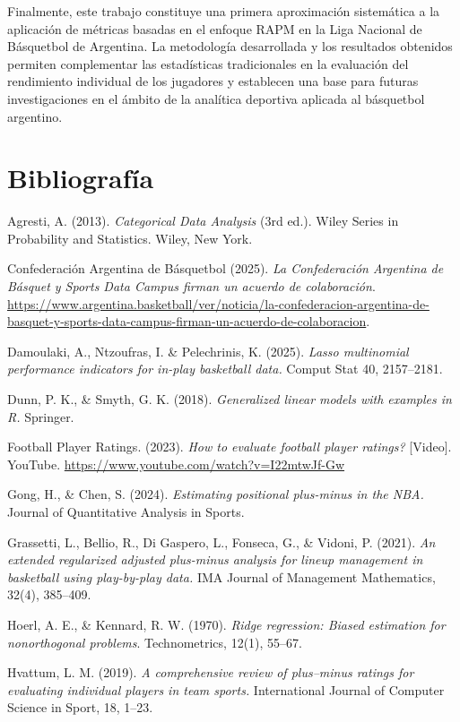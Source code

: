 \documentclass[
  12pt,
]{article}
\begin{document}
Finalmente, este trabajo constituye una primera aproximación sistemática
a la aplicación de métricas basadas en el enfoque RAPM en la Liga
Nacional de Básquetbol de Argentina. La metodología desarrollada y los
resultados obtenidos permiten complementar las estadísticas
tradicionales en la evaluación del rendimiento individual de los
jugadores y establecen una base para futuras investigaciones en el
ámbito de la analítica deportiva aplicada al básquetbol argentino.

\newpage

\section{Bibliografía}\label{bibliografuxeda}

Agresti, A. (2013). \emph{Categorical Data Analysis} (3rd ed.). Wiley
Series in Probability and Statistics. Wiley, New York.

Confederación Argentina de Básquetbol (2025). \emph{La Confederación
Argentina de Básquet y Sports Data Campus firman un acuerdo de
colaboración}.
\url{https://www.argentina.basketball/ver/noticia/la-confederacion-argentina-de-basquet-y-sports-data-campus-firman-un-acuerdo-de-colaboracion}.

Damoulaki, A., Ntzoufras, I. \& Pelechrinis, K. (2025). \emph{Lasso
multinomial performance indicators for in-play basketball data.} Comput
Stat 40, 2157--2181.

Dunn, P. K., \& Smyth, G. K. (2018). \emph{Generalized linear models
with examples in R.} Springer.

Football Player Ratings. (2023). \emph{How to evaluate football player
ratings?} {[}Video{]}. YouTube.
\url{https://www.youtube.com/watch?v=I22mtwJf-Gw}

Gong, H., \& Chen, S. (2024). \emph{Estimating positional plus-minus in
the NBA.} Journal of Quantitative Analysis in Sports.

Grassetti, L., Bellio, R., Di Gaspero, L., Fonseca, G., \& Vidoni, P.
(2021). \emph{An extended regularized adjusted plus-minus analysis for
lineup management in basketball using play-by-play data.} IMA Journal of
Management Mathematics, 32(4), 385--409.

Hoerl, A. E., \& Kennard, R. W. (1970). \emph{Ridge regression: Biased
estimation for nonorthogonal problems}. Technometrics, 12(1), 55--67.

Hvattum, L. M. (2019). \emph{A comprehensive review of plus--minus
ratings for evaluating individual players in team sports.} International
Journal of Computer Science in Sport, 18, 1--23.
\end{document}
